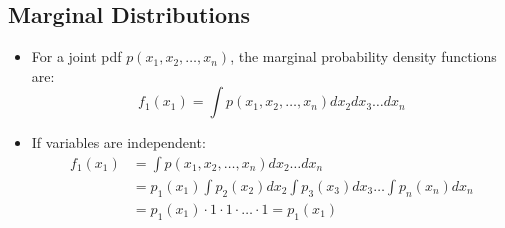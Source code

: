 \subsection{Marginal Distributions}
\begin{itemize}
    \item For a joint pdf $p(x_1, x_2, \ldots, x_n)$, the marginal probability density functions are:
          \[ f_1(x_1) = \int p(x_1, x_2, \ldots, x_n) dx_2 dx_3 \ldots dx_n \]

    \item If variables are independent:
          \begin{align*}
              f_1(x_1) & = \int p(x_1, x_2, \ldots, x_n) dx_2 \ldots dx_n                           \\
                       & = p_1(x_1) \int p_2(x_2) dx_2 \int p_3(x_3) dx_3 \ldots \int p_n(x_n) dx_n \\
                       & = p_1(x_1) \cdot 1 \cdot 1 \cdot \ldots \cdot 1 = p_1(x_1)
          \end{align*}
\end{itemize}

